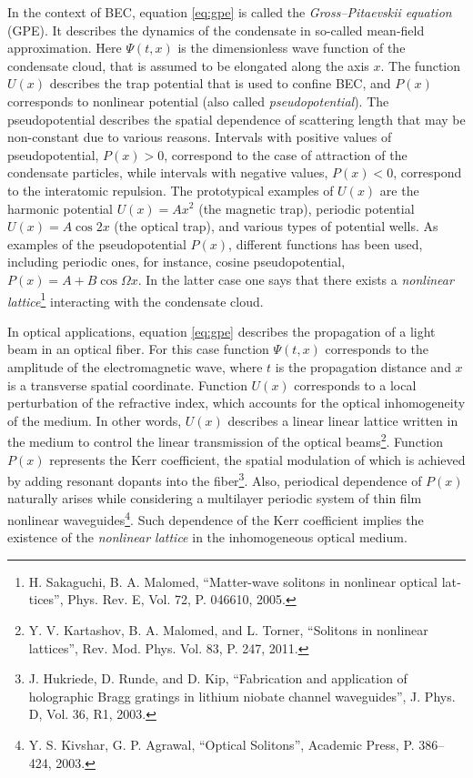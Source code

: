 \documentclass[candidate, href, colorlinks]{disser}
\begin{document}
In the context of BEC, equation \eqref{eq:gpe} is called the {\it Gross--Pitaevskii equation} (GPE).
It describes the dynamics of the condensate in so-called mean-field approximation.
Here $\Psi(t, x)$ is the dimensionless wave function of the condensate cloud, that is assumed to be elongated along the axis $x$.
The function $U(x)$ describes the trap potential that is used to confine BEC, and $P(x)$ corresponds to nonlinear potential (also called {\it pseudopotential}).
The pseudopotential describes the spatial dependence of scattering length that may be non-constant due to various reasons.
Intervals with positive values of pseudopotential, $P(x) > 0$, correspond to the case of attraction of the condensate particles, while intervals with negative values, $P(x) < 0$, correspond to the interatomic repulsion.
The prototypical examples of $U(x)$ are the harmonic potential $U(x) = Ax^2$ (the magnetic trap), periodic potential $U(x) = A \cos 2x$ (the optical trap), and various types of potential wells.
As examples of the pseudopotential $P(x)$, different functions has been used, including periodic ones, for instance, cosine pseudopotential, $P(x) = A + B \cos \Omega x$.
In the latter case one says that there exists a {\it nonlinear lattice}\footnote{\label{note:malomed} H. Sakaguchi,  B. A. Malomed, ``Matter-wave solitons in nonlinear optical lat­tices'', Phys. Rev. E, Vol. 72, P. 046610, 2005.} interacting with the condensate cloud.

In optical applications, equation \eqref{eq:gpe} describes the propagation of a light beam in an optical fiber.
For this case function $\Psi(t, x)$ corresponds to the amplitude of the electromagnetic wave, where $t$ is the propagation distance and $x$ is a transverse spatial coordinate.
Function $U(x)$ corresponds to a local perturbation of the refractive index, which accounts for the optical inhomogeneity of the medium.
In other words, $U(x)$ describes a linear linear lattice written in the medium to control the linear transmission of the optical beams\footnote{\label{note:torner} Y. V. Kartashov, B. A. Malomed, and L. Torner, ``Solitons in nonlinear lattices'', Rev. Mod. Phys. Vol. 83, P. 247, 2011.}.
Function $P(x)$ represents the Kerr coefficient, the spatial modulation of which is achieved by adding resonant dopants into the fiber\footnote{J. Hukriede, D. Runde, and D. Kip, ``Fabrication and application of holographic Bragg gratings in lithium niobate channel waveguides'', J. Phys. D, Vol. 36, R1, 2003.}.
Also, periodical dependence of $P(x)$ naturally arises while considering a multilayer periodic system of thin film nonlinear waveguides\footnote{Y. S. Kivshar, G. P. Agrawal, ``Optical Solitons'', Academic Press, P. 386--424, 2003.}.
Such dependence of the Kerr coefficient implies the existence of
the {\it nonlinear lattice} in the inhomogeneous optical medium.
\end{document}
